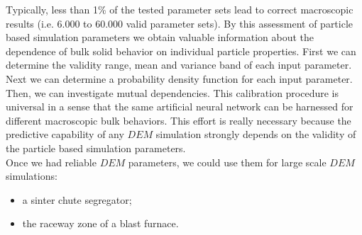Typically, less than 1\% of the tested parameter sets lead to correct
macroscopic results (i.e. 6.000 to 60.000 valid parameter sets).
By this assessment of particle based simulation parameters we obtain valuable information about the dependence 
of bulk solid behavior on individual particle properties.
First we can determine the validity range, mean and variance band of each input
parameter. Next we can determine a probability density function for each input
parameter. Then, we can investigate mutual dependencies.
This calibration procedure is universal in a sense that the same artificial neural network can be harnessed for 
different macroscopic bulk behaviors.
This effort is really necessary because the predictive capability of any $DEM$
simulation strongly depends on the validity of the particle 
based simulation parameters.\\
Once we had reliable $DEM$ parameters, we could use them for large scale $DEM$
simulations:
\begin{itemize}
\item{a sinter chute segregator;}
\item{the raceway zone of a blast furnace.}
\end{itemize}